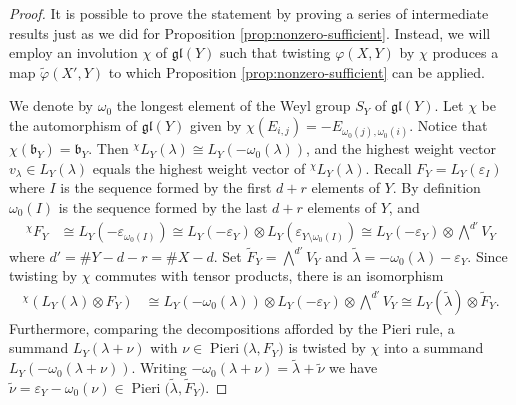 \documentclass[11pt,fleqn]{amsart}
\renewcommand\phi{\varphi}
\renewcommand\epsilon{\varepsilon}
\theoremstyle{definition}
\theoremstyle{remark}
\theoremstyle{remark}
\newcommand\gl{\mathfrak{gl}}
\newcommand\lie[1]{\mathfrak{#1}}
\newcommand\Pieri[2]{\operatorname{Pieri}{(#1},{#2)}}
\begin{document}
\begin{proof}
It is possible to prove the statement by proving a series of intermediate 
results just as we did for Proposition \ref{prop:nonzero-sufficient}. Instead,  
we will employ an involution $\chi$ of $\gl(Y)$ such that twisting
$\phi(X,Y)$ by $\chi$ produces a map $\tilde \phi(X',Y)$ to which Proposition 
\ref{prop:nonzero-sufficient} can be applied. 

We denote by $\omega_0$ the longest element of the Weyl group $S_Y$ of 
$\gl(Y)$. Let $\chi$ be the automorphism of $\gl(Y)$ given by $\chi(E_{i,j}) = 
-E_{\omega_0(j), \omega_0(i)}$. Notice that $\chi(\lie b_Y) = \lie b_Y$. Then 
${}^\chi L_Y(\lambda) \cong L_Y(-\omega_0(\lambda))$, and the highest weight 
vector $v_\lambda \in L_Y(\lambda)$ equals the highest weight vector of 
${}^\chi L_Y(\lambda)$. Recall $F_Y = L_Y(\epsilon_I)$ where $I$ is the 
sequence formed by the first $d+r$ elements of $Y$. By definition $\omega_0(I)$ 
is the sequence formed by the last $d+r$ elements of $Y$, and
\begin{align*}
{}^\chi F_Y 
    &\cong L_Y(-\epsilon_{\omega_0(I)})
    \cong L_Y(-\epsilon_Y) \otimes L_Y(\epsilon_{Y \setminus \omega_0(I)})
    \cong L_Y(-\epsilon_Y) \otimes \bigwedge^{d'} V_Y 
\end{align*}
where $d' = \# Y - d - r = \#X - d$. Set $\tilde F_Y = \bigwedge^{d'} V_Y$ and 
$\tilde \lambda = -\omega_0(\lambda) - \epsilon_Y$. Since twisting by $\chi$ 
commutes with tensor products, there is an isomorphism
\begin{align*}
  {}^\chi(L_Y(\lambda) \otimes F_Y)
    &\cong L_Y(-\omega_0(\lambda)) \otimes L_Y(-\epsilon_Y) \otimes 
       \bigwedge^{d'} V_Y \cong L_Y(\tilde \lambda) \otimes \tilde F_Y.
\end{align*}
Furthermore, comparing the decompositions afforded by the Pieri rule, a summand
$L_Y(\lambda + \nu)$ with $\nu \in \Pieri{\lambda}{F_Y}$ is twisted by $\chi$ 
into a summand $L_Y(-\omega_0(\lambda + \nu))$. Writing $-\omega_0(\lambda + 
\nu) = \tilde \lambda + \tilde \nu$ we have $\tilde \nu = \epsilon_Y - 
\omega_0(\nu) \in \Pieri{\tilde \lambda}{\tilde F_Y}$.


\end{proof}
\end{document}
